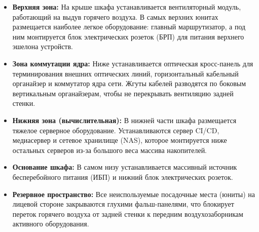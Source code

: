 \documentclass[a4paper,oneside,14pt]{extreport}
\begin{document}
\begin{itemize}
    \item \textbf{Верхняя зона:} На крыше шкафа устанавливается вентиляторный модуль, работающий на выдув горячего воздуха. В самых верхних юнитах размещается наиболее легкое оборудование: главный маршрутизатор, а под ним монтируется блок электрических розеток (БРП) для питания верхнего эшелона устройств.
    \item \textbf{Зона коммутации ядра:} Ниже устанавливается оптическая кросс-панель для терминирования внешних оптических линий, горизонтальный кабельный органайзер и коммутатор ядра сети. Жгуты кабелей разводятся по боковым вертикальным органайзерам, чтобы не перекрывать вентиляцию задней стенки.
    \item \textbf{Нижняя зона (вычислительная):} В нижней части шкафа размещается тяжелое серверное оборудование. Устанавливаются сервер CI/CD, медиасервер и сетевое хранилище (NAS), которое монтируется ниже остальных серверов из-за большого веса массива накопителей.
    \item \textbf{Основание шкафа:} В самом низу устанавливается массивный источник бесперебойного питания (ИБП) и нижний блок электрических розеток.
    \item \textbf{Резервное пространство:} Все неиспользуемые посадочные места (юниты) на лицевой стороне закрываются глухими фальш-панелями, что блокирует переток горячего воздуха от задней стенки к передним воздухозаборникам активного оборудования.
\end{itemize}
\end{document}
